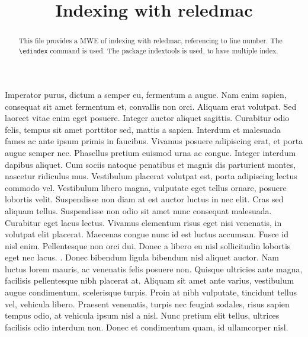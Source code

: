 \documentclass{article}
\begin{document}
\begin{english}
\date{}
\title{Indexing with reledmac}
\maketitle

\begin{abstract}
 This file provides a MWE of indexing with reledmac, referencing to line number.
 The \verb+\edindex+ command is used. The package indextools is used, to have multiple index.
\end{abstract}
\end{english}

\beginnumbering
\pstart
Imperator purus, dictum a semper eu, fermentum a augue. Nam enim sapien, consequat sit amet fermentum et, convallis non orci. Aliquam erat volutpat. Sed laoreet vitae enim eget posuere. Integer auctor aliquet sagittis. Curabitur odio felis, tempus sit amet porttitor sed, mattis a sapien. Interdum et malesuada fames ac ante ipsum primis in faucibus. Vivamus posuere adipiscing erat, et porta augue semper nec.
\pend
\pstart
Phasellus pretium euismod urna ac congue. Integer interdum dapibus aliquet. Cum sociis natoque penatibus et magnis dis parturient montes, nascetur ridiculus mus. Vestibulum placerat volutpat est, porta adipiscing lectus commodo vel. Vestibulum libero magna, vulputate eget tellus ornare, posuere lobortis velit. Suspendisse non diam at est auctor luctus in nec elit. Cras sed aliquam tellus. Suspendisse non odio sit amet nunc consequat malesuada. Curabitur eget lacus lectus. Vivamus elementum risus eget nisi venenatis, in volutpat elit placerat. Maecenas congue nunc id est luctus accumsan. Fusce id nisl enim.
\pend
\pstart
Pellentesque non orci dui. Donec a libero eu nisl sollicitudin lobortis eget nec lacus. . Donec bibendum ligula bibendum nisl aliquet auctor. Nam luctus lorem mauris, ac venenatis felis posuere non. Quisque ultricies ante magna, facilisis pellentesque nibh placerat at. Aliquam sit amet ante varius, vestibulum augue condimentum, scelerisque turpis. Proin at nibh vulputate, tincidunt tellus vel, vehicula libero. Praesent venenatis, turpis nec feugiat sodales, risus sapien tempus odio, at vehicula ipsum nisl a nisl. Nunc pretium elit tellus, ultrices facilisis odio interdum non. Donec et condimentum quam, id ullamcorper nisl.
\pend
\endnumbering

\newpage
\printindex

\printindex[name]
\end{document}
